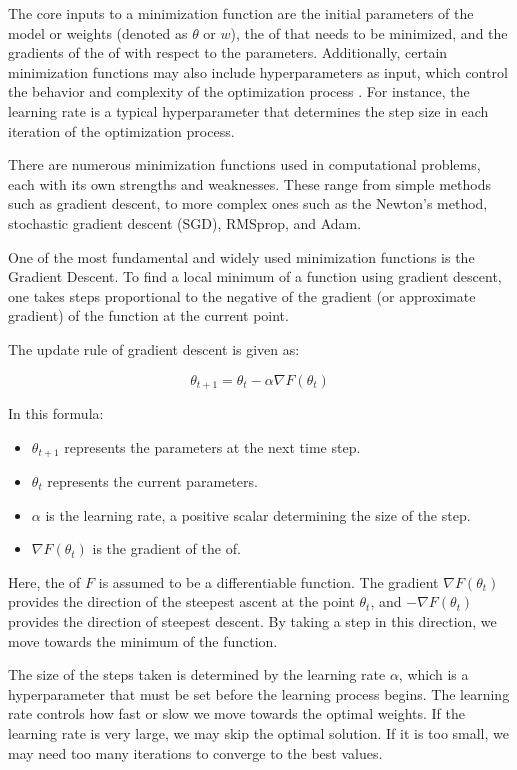 \documentclass[
  a4paper,  %
  twoside,  %
  bibliography=totoc,
  headsepline,
  cleardoublepage=empty,
  parskip=half,
  draft=false
]{scrbook}
\begin{document}
The core inputs to a minimization function are the initial parameters of the model or weights (denoted as \(\theta\) or \(w\)),
the \gls{of} that needs to be minimized, and the gradients of the \gls{of} with respect to the parameters.
Additionally, certain minimization functions may also include hyperparameters as input, which control the behavior and complexity of the optimization process \cite{Virtanen2020}.
For instance, the learning rate is a typical hyperparameter that determines the step size in each iteration of the optimization process.

There are numerous minimization functions used in computational problems, each with its own strengths and weaknesses.
These range from simple methods such as gradient descent, to more complex ones such as the Newton's method, stochastic gradient descent (SGD), RMSprop, and Adam.

One of the most fundamental and widely used minimization functions is the Gradient Descent.
To find a local minimum of a function using gradient descent, one takes steps proportional to the negative of the gradient (or approximate gradient) of the function at the current point.

The update rule of gradient descent is given as:

\[
\theta_{t+1} = \theta_t - \alpha \nabla F(\theta_t)
\]

In this formula:

\begin{itemize}
  \item \(\theta_{t+1}\) represents the parameters at the next time step.
  \item \(\theta_t\) represents the current parameters.
  \item \(\alpha\) is the learning rate, a positive scalar determining the size of the step.
  \item \(\nabla F(\theta_t)\) is the gradient of the \gls{of}.
\end{itemize}

Here, the \gls{of} \(F\) is assumed to be a differentiable function.
The gradient \(\nabla F(\theta_t)\) provides the direction of the steepest ascent at the point \(\theta_t\), and \(-\nabla F(\theta_t)\) provides the direction of steepest descent.
By taking a step in this direction, we move towards the minimum of the function.

The size of the steps taken is determined by the learning rate \(\alpha\), which is a hyperparameter that must be set before the learning process begins.
The learning rate controls how fast or slow we move towards the optimal weights.
If the learning rate is very large, we may skip the optimal solution.
If it is too small, we may need too many iterations to converge to the best values.
\end{document}
